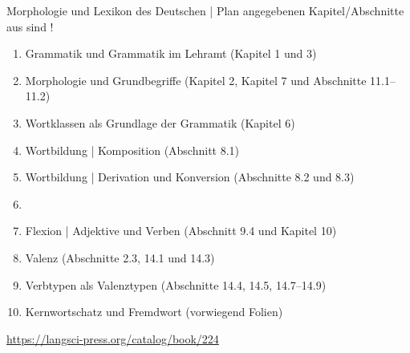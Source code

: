 \begin{frame}
  {Morphologie und Lexikon des Deutschen | Plan}
   angegebenen Kapitel\slash Abschnitte aus  sind !\\
  \Halbzeile
  \begin{enumerate}
    \item Grammatik und Grammatik im Lehramt (Kapitel 1 und 3)
    \item Morphologie und Grundbegriffe (Kapitel 2, Kapitel 7 und Abschnitte 11.1--11.2)
    \item Wortklassen als Grundlage der Grammatik (Kapitel 6)
    \item Wortbildung | Komposition (Abschnitt 8.1)
    \item Wortbildung | Derivation und Konversion (Abschnitte 8.2 und 8.3)
    \item {}
    \item Flexion | Adjektive und Verben (Abschnitt 9.4 und Kapitel 10)
    \item Valenz (Abschnitte 2.3, 14.1 und 14.3)
    \item Verbtypen als Valenztypen (Abschnitte 14.4, 14.5, 14.7--14.9) 
    \item Kernwortschatz und Fremdwort (vorwiegend Folien)
  \end{enumerate}
  \Halbzeile
  \centering 
  \url{https://langsci-press.org/catalog/book/224}
\end{frame}

